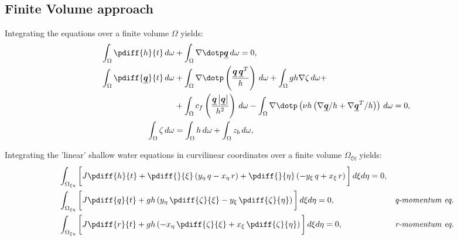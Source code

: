 \subsection*{Finite Volume approach}
Integrating the equations over a finite volume $\Omega$ yields:
\begin{subequations}
\begin{align}
    \int_\Omega \pdiff{h}{t}\, d\omega &
    + \int_\Omega \nabla \dotp \vec{q}\, d\omega  = 0,
    \label{eq:pressure_dependent_on_zeta_a}
    \\
    \int_\Omega \pdiff{\vec{q}}{t}\, d\omega &
    + \int_\Omega \nabla \dotp \left( \frac{\vec{q}\,\vec{q}^T}{h} \right)\, d\omega
    + \int_\Omega gh \nabla \zeta\, d\omega +
    \nonumber \\
    & + \int_\Omega c_f \left( \frac{\vec{q}\abs{\vec{q}}}{h^2} \right)\, d\omega
    - \int_\Omega \nabla \dotp \left( \nu h \left(  \nabla \vec{q}/h + \nabla \vec{q}^T/h \right) \right)\, d\omega = 0,
    \label{eq:pressure_dependent_on_zeta_b}
    \\
    \int_\Omega \zeta\, d\omega &
    = \int_\Omega h\, d\omega + \int_\Omega z_b\, d\omega,
    \label{eq:pressure_dependent_on_zeta_c}
\end{align}
\label{eq:pressure_dependent_on_zeta}
\end{subequations}

Integrating the 'linear' shallow water equations in curvilinear  coordinates over a finite volume $\Omega_{\xi\eta}$ yields:
\begin{align}
    &\int_{\Omega_{\xi\eta}}\bigg[ J \pdiff{h}{t} +\pdiff{}{\xi} \left( y_{\eta}\, q - x_{\eta}\, r \right) + \pdiff{}{\eta} \left( -y_{\xi}\, q + x_{\xi}\, r \right)\bigg] \, d\xi d\eta = 0,
    \label{eq:volume_xieta_continuity_curvi}
    \\*
    &\int_{\Omega_{\xi\eta}}\bigg[ J \pdiff{q}{t} + g h \left( y_{\eta}\, \pdiff{\zeta}{\xi} - y_{\xi}\, \pdiff{\zeta}{\eta} \right) \bigg] \, d\xi d\eta = 0, & \textit{q-momentum eq.}
    \label{eq:volume_xi_momentum_curvi}
    \\*
    &\int_{\Omega_{\xi\eta}}\bigg[ J \pdiff{r}{t} + g h \left( -x_{\eta}\, \pdiff{\zeta}{\xi} + x_{\xi}\, \pdiff{\zeta}{\eta} \right) \bigg] \, d\xi d\eta = 0, & \textit{r-momentum eq.}
    \label{eq:volume_eta_momentum_curvi}
\end{align}

